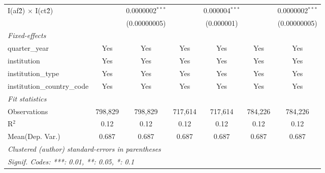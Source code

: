 \begin{tabular}{lcccccc}
   I(af\^2) $\times$ I(ct\^2)         &               & 0.0000002$^{***}$ &               & 0.000004$^{***}$ &               & 0.0000002$^{***}$\\   
                                      &               & (0.00000005)      &               & (0.000001)       &               & (0.00000005)\\   
   \midrule
   \emph{Fixed-effects}\\
   quarter\_year                      & Yes           & Yes               & Yes           & Yes              & Yes           & Yes\\  
   institution                        & Yes           & Yes               & Yes           & Yes              & Yes           & Yes\\  
   institution\_type                  & Yes           & Yes               & Yes           & Yes              & Yes           & Yes\\  
   institution\_country\_code         & Yes           & Yes               & Yes           & Yes              & Yes           & Yes\\  
   \midrule
   \emph{Fit statistics}\\
   Observations                       & 798,829       & 798,829           & 717,614       & 717,614          & 784,226       & 784,226\\  
   R$^2$                              & 0.12          & 0.12              & 0.12          & 0.12             & 0.12          & 0.12\\  
Mean(Dep. Var.) & 0.687 & 0.687 & 0.687 & 0.687 & 0.687 & 0.687 \\
   \midrule \midrule
   \multicolumn{7}{l}{\emph{Clustered (author) standard-errors in parentheses}}\\
   \multicolumn{7}{l}{\emph{Signif. Codes: ***: 0.01, **: 0.05, *: 0.1}}\\
\end{tabular}
\par\endgroup
